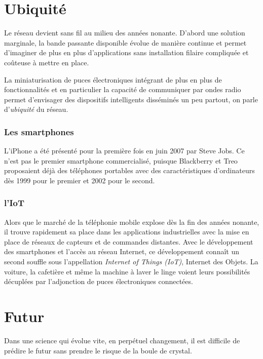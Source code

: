 \documentclass[a4paper,11pt]{book}
\begin{document}
\section{Ubiquité}
Le réseau devient sans fil au milieu des années nonante. D'abord une solution marginale, la bande passante disponible évolue de manière continue et permet d'imaginer de plus en plus d'applications sans installation filaire compliquée et coûteuse à mettre en place.

La miniaturisation de puces électroniques intégrant de plus en plus de fonctionnalités et en particulier la capacité de communiquer par ondes radio permet d'envisager des dispositifs intelligents disséminés un peu partout, on parle d'\textit{ubiquité} du réseau.

\subsubsection{Les smartphones}
L'iPhone a été présenté pour la première fois en juin 2007 par Steve Jobs. Ce n'est pas le premier smartphone commercialisé, puisque Blackberry et Treo proposaient déjà des téléphones portables avec des caractéristiques d'ordinateurs dès 1999 pour le premier et 2002 pour le second.

\subsubsection{l'IoT}
Alors que le marché de la téléphonie mobile explose dès la fin des années nonante, il trouve rapidement sa place dans les applications industrielles avec la mise en place de réseaux de capteurs et de commandes distantes. Avec le développement des smartphones et l'accès au réseau Internet, ce développement connaît un second souffle sous l'appellation \textit{Internet of Things (IoT)}, Internet des Objets. La voiture, la cafetière et même la machine à laver le linge voient leurs possibilités décuplées par l'adjonction de puces électroniques connectées.

\section{Futur}
Dans une science qui évolue vite, en perpétuel changement, il est difficile de prédire le futur sans prendre le risque de la boule de crystal. 
\end{document}
